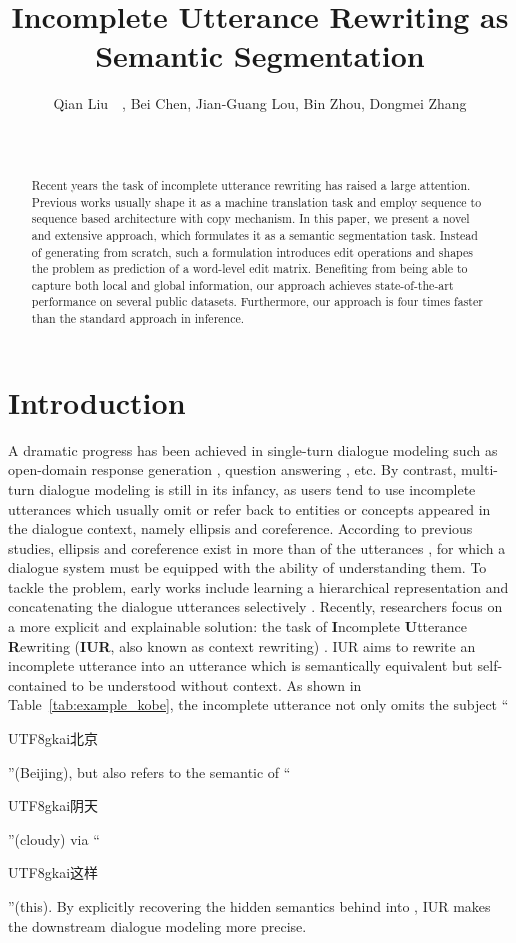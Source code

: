 \documentclass[11pt,a4paper]{article}
\title{Incomplete Utterance Rewriting as Semantic Segmentation}
\author{Qian Liu\affmark[\textdagger]{\thanks{~~Work done during an internship at Microsoft Research.}}~~, Bei Chen\affmark[\S], Jian-Guang Lou\affmark[\S], Bin Zhou\affmark[\textdagger], Dongmei Zhang\affmark[\S]\\
\affaddr{\affmark[\textdagger]School of Computer Science and Engineering, Beihang University, China}\\
\affaddr{\affmark[\S]Microsoft Research, Beijing, China}\\
\affmark[\textdagger]\email{\{qian.liu, zhoubin\}@buaa.edu.cn; \affmark[\S]\{beichen, jlou, dongmeiz\}@microsoft.com}}
\date{}
\newcommand{\chinese}[1]{\begin{CJK*}{UTF8}{gkai}{#1}\end{CJK*}}
\begin{document}
\maketitle
\begin{abstract}

Recent years the task of incomplete utterance rewriting has raised a large attention. Previous works usually shape it as a machine translation task and employ sequence to sequence based architecture with copy mechanism. In this paper, we present a novel and extensive approach, which formulates it as a semantic segmentation task. Instead of generating from scratch, such a formulation introduces edit operations and shapes the problem as prediction of a word-level edit matrix. Benefiting from being able to capture both local and global information, our approach achieves state-of-the-art performance on several public datasets. Furthermore, our approach is four times faster than the standard approach in inference.


\end{abstract}

\section{Introduction}

A dramatic progress has been achieved in single-turn dialogue modeling such as open-domain response generation \cite{shang-etal-2015-neural}, question answering \cite{rajpurkar-etal-2016-squad}, etc. By contrast, multi-turn dialogue modeling is still in its infancy, as users tend to use incomplete utterances which usually omit or refer back to entities or concepts appeared in the dialogue context, namely ellipsis and coreference. According to previous studies, ellipsis and coreference exist in more than  of the utterances \cite{su-etal-2019-improving}, for which a dialogue system must be equipped with the ability of understanding them. To tackle the problem, early works include learning a hierarchical representation \cite{serban2017hierarchical,zhang-etal-2018-context} and concatenating the dialogue utterances selectively \cite{yan-2016-learning}. Recently, researchers focus on a more explicit and explainable solution: the task of \textbf{I}ncomplete \textbf{U}tterance \textbf{R}ewriting (\textbf{IUR}, also known as context rewriting) \cite{kumar-joshi-2016-non,su-etal-2019-improving,liu-etal-2019-split,pan-etal-2019-improving,elgohary-etal-2019-unpack,zhou-etal-2019-unsupervised}. IUR aims to rewrite an incomplete utterance into an utterance which is semantically equivalent but self-contained to be understood without context. As shown in Table~\ref{tab:example_kobe}, the incomplete utterance  not only omits the subject ``\chinese{北京}''(Beijing), but also refers to the semantic of ``\chinese{阴天}''(cloudy) via ``\chinese{这样}''(this). By explicitly recovering the hidden semantics behind  into , IUR makes the downstream dialogue modeling more precise.
\end{document}
